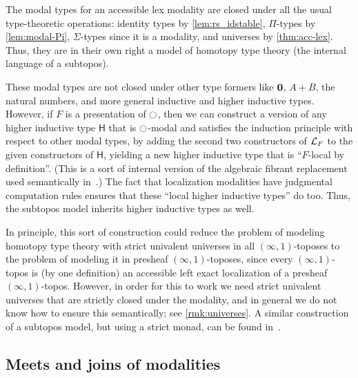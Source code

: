\begin{rmk}\label{thm:subtopos-model}
  The modal types for an accessible lex modality are closed under all the usual type-theoretic operations: identity types by \cref{lem:rs_idstable}, $\Pi$-types by \cref{lem:modal-Pi}, $\Sigma$-types since it is a modality, and universes by \cref{thm:acc-lex}.
  Thus, they are in their own right a model of homotopy type theory (the internal language of a subtopos).

  These modal types are not closed under other type formers like $\mathbf{0}$, $A+B$, the natural numbers, and more general inductive and higher inductive types.
  However, if $F$ is a presentation of ${\ocircle}$, then we can construct a version of any higher inductive type $\mathsf{H}$ that is ${\ocircle}$-modal and satisfies the induction principle with respect to other modal types, by adding the second two constructors of $\mathcal{L}_{F}$ to the given constructors of $\mathsf{H}$, yielding a new higher inductive type that is ``$F$-local by definition''.
  (This is a sort of internal version of the algebraic fibrant replacement used semantically in~\cite{ls:hits}.)
  The fact that localization modalities have judgmental computation rules ensures that these ``local higher inductive types'' do too.
  Thus, the subtopos model inherits higher inductive types as well.

  In principle, this sort of construction could reduce the problem of modeling homotopy type theory with strict univalent universes in all $(\infty,1)$-toposes to the problem of modeling it in presheaf $(\infty,1)$-toposes, since every $(\infty,1)$-topos is (by one definition) an accessible left exact localization of a presheaf $(\infty,1)$-topos.
  However, in order for this to work we need strict univalent universes that are strictly closed under the modality, and in general we do not know how to ensure this semantically; see \cref{rmk:universes}.
  A similar construction of a subtopos model, but using a strict monad, can be found in~\cite{Stacks,Coquand:stack}.
\end{rmk}


\subsection{Meets and joins of modalities}
\label{sec:poset-modalities}

